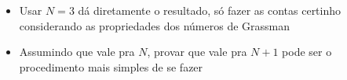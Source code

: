 \begin{itemize}
    \item Usar $N=3$ dá diretamente o resultado, só fazer as contas certinho considerando as propriedades dos números de Grassman
    \item Assumindo que vale pra $N$, provar que vale pra $N+1$ pode ser o procedimento mais simples de se fazer
\end{itemize}